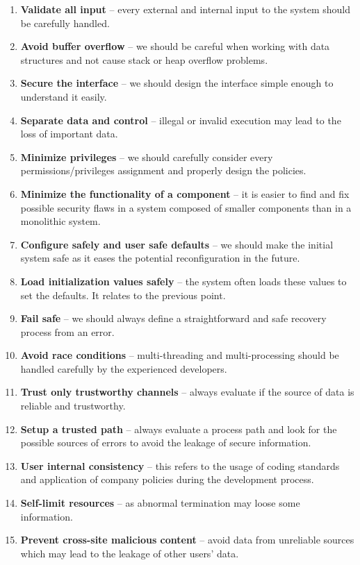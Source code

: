 \documentclass[12pt,a4,twoside]{article}
\begin{document}
\begin{enumerate}
    \item \textbf{Validate all input} -- every external and internal input to the system should be carefully handled.
    \item \textbf{Avoid buffer overflow} -- we should be careful when working with data structures and not cause stack or heap overflow problems.
    \item \textbf{Secure the interface} -- we should design the interface simple enough to understand it easily.
    \item \textbf{Separate data and control} -- illegal or invalid execution may lead to the loss of important data.
    \item \textbf{Minimize privileges} -- we should carefully consider every permissions/privileges assignment and properly design the policies.
    \item \textbf{Minimize the functionality of a component} -- it is easier to find and fix possible security flaws in a system composed of smaller components than in a monolithic system.
    \item \textbf{Configure safely and user safe defaults} -- we should make the initial system safe as it eases the potential reconfiguration in the future.
    \item \textbf{Load initialization values safely} -- the system often loads these values to set the defaults. It relates to the previous point.
    \item \textbf{Fail safe} -- we should always define a straightforward and safe recovery process from an error.
    \item \textbf{Avoid race conditions} -- multi-threading and multi-processing should be handled carefully by the experienced developers.
    \item \textbf{Trust only trustworthy channels} -- always evaluate if the source of data is reliable and trustworthy.
    \item \textbf{Setup a trusted path} -- always evaluate a process path and look for the possible sources of errors to avoid the leakage of secure information.
    \item \textbf{User internal consistency} -- this refers to the usage of coding standards and application of company policies during the development process.
    \item \textbf{Self-limit resources} -- as abnormal termination may loose some information.
    \item \textbf{Prevent cross-site malicious content} -- avoid data from unreliable sources which may lead to the leakage of other users' data.

\end{enumerate}
\end{document}
